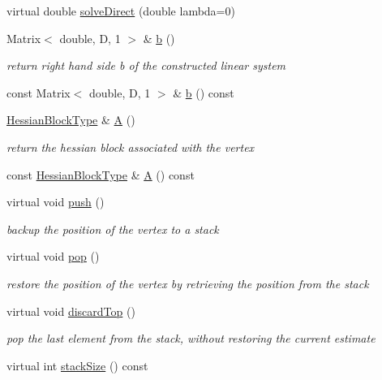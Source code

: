 \begin{DoxyCompactItemize}
\item 
virtual double \hyperlink{classg2o_1_1BaseVertex_a0bbd9551b7e03f7e422169e396e8ec9b}{solve\+Direct} (double lambda=0)
\item 
Matrix$<$ double, D, 1 $>$ \& \hyperlink{classg2o_1_1BaseVertex_af7a70ede844ad023ba32edde16c8c745}{b} ()
\begin{DoxyCompactList}\small\item\em return right hand side b of the constructed linear system \end{DoxyCompactList}\item 
const Matrix$<$ double, D, 1 $>$ \& \hyperlink{classg2o_1_1BaseVertex_a209c260b9a2730a832270cf3cf7ab605}{b} () const 
\item 
\hyperlink{classg2o_1_1BaseVertex_a887928bc60710e0ec9acb269ee7411db}{Hessian\+Block\+Type} \& \hyperlink{classg2o_1_1BaseVertex_a43bcf2bb3420a0b2cb80bfd297b464a6}{A} ()
\begin{DoxyCompactList}\small\item\em return the hessian block associated with the vertex \end{DoxyCompactList}\item 
const \hyperlink{classg2o_1_1BaseVertex_a887928bc60710e0ec9acb269ee7411db}{Hessian\+Block\+Type} \& \hyperlink{classg2o_1_1BaseVertex_a2f5a9a5bdf0faa43b6082dc3e5a05d45}{A} () const 
\item 
virtual void \hyperlink{classg2o_1_1BaseVertex_ae6edf93fe07aa27579a9352faa83098c}{push} ()
\begin{DoxyCompactList}\small\item\em backup the position of the vertex to a stack \end{DoxyCompactList}\item 
virtual void \hyperlink{classg2o_1_1BaseVertex_a502bf3db2ee32061a2c8257ef81a1552}{pop} ()
\begin{DoxyCompactList}\small\item\em restore the position of the vertex by retrieving the position from the stack \end{DoxyCompactList}\item 
virtual void \hyperlink{classg2o_1_1BaseVertex_a71729c4d91044bde9bfea4c859b0c02d}{discard\+Top} ()
\begin{DoxyCompactList}\small\item\em pop the last element from the stack, without restoring the current estimate \end{DoxyCompactList}\item 
virtual int \hyperlink{classg2o_1_1BaseVertex_ad40208e3c8e3c221560c69af176b2eb6}{stack\+Size} () const 

\end{DoxyCompactItemize}
